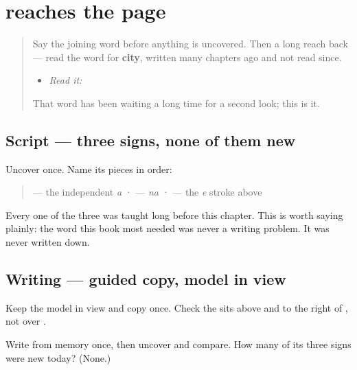 \section[\texorpdfstring{\gu{અને} (ane)}{અને (ane)}]{ reaches the page}

\label{lesson:GU-C32-ane-write}



\begin{quote}
Say the joining word before anything is uncovered. Then a long reach back — read the word for \textbf{city}, written many chapters ago and not read since.

\begin{itemize}
\raggedright
  \item \emph{Read it:} \textbf{}
\end{itemize}

That word has been waiting a long time for a second look; this is it.
\end{quote}

\subsection*{Script — three signs, none of them new}
Uncover \textbf{} once. Name its pieces in order:

\begin{quote}
\textbf{} — the independent \emph{a} · \textbf{} — \emph{na} · \textbf{} — the \emph{e} stroke above
\end{quote}

Every one of the three was taught long before this chapter. This is worth saying plainly: the word this book most needed was never a writing problem. It was never written down.

\subsection*{Writing — guided copy, model in view}

Keep the model in view and copy \textbf{} once. Check the \textbf{} sits above and to the right of \textbf{}, not over \textbf{}.

\begin{tcolorbox}[breakable,colback=teal!4,colframe=teal!35!black,title={Before you move on}]
Write \textbf{} from memory once, then uncover and compare. How many of its three signs were new today? (None.)
\end{tcolorbox}
